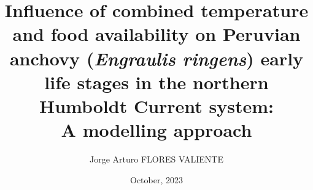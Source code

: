 \documentclass[a4paper,12pt]{book} %
\author{Jorge Arturo FLORES VALIENTE}
\title{Influence of combined temperature and food availability on Peruvian anchovy (\textit{Engraulis ringens}) early life stages in the northern Humboldt Current system:\\A modelling approach}
\date{October, 2023}
\begin{document}
\frontmatter

\tableofcontents
\listoffigures
\listoftables
%
%

%

\mainmatter
\linenumbers





\nolinenumbers


%

\backmatter


%

\end{document}
